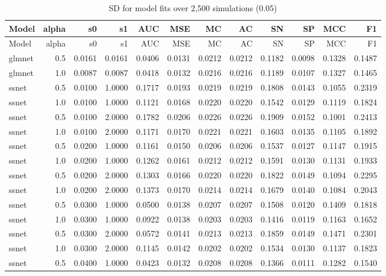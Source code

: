 \documentclass[
]{article}
\begin{document}
\begin{longtable}[]{@{}lrrrrrrrrrrr@{}}
\caption{SD for model fits over 2,500 simulations (0.05)}\tabularnewline
\toprule
Model & alpha & s0 & s1 & AUC & MSE & MC & AC & SN & SP & MCC & F1 \\
\midrule
\endfirsthead
\toprule
Model & alpha & s0 & s1 & AUC & MSE & MC & AC & SN & SP & MCC & F1 \\
\midrule
\endhead
glmnet & 0.5 & 0.0161 & 0.0161 & 0.0406 & 0.0131 & 0.0212 & 0.0212 &
0.1182 & 0.0098 & 0.1328 & 0.1487 \\
glmnet & 1.0 & 0.0087 & 0.0087 & 0.0418 & 0.0132 & 0.0216 & 0.0216 &
0.1189 & 0.0107 & 0.1327 & 0.1465 \\
ssnet & 0.5 & 0.0100 & 1.0000 & 0.1717 & 0.0193 & 0.0219 & 0.0219 &
0.1808 & 0.0143 & 0.1055 & 0.2319 \\
ssnet & 1.0 & 0.0100 & 1.0000 & 0.1121 & 0.0168 & 0.0220 & 0.0220 &
0.1542 & 0.0129 & 0.1119 & 0.1824 \\
ssnet & 0.5 & 0.0100 & 2.0000 & 0.1782 & 0.0206 & 0.0226 & 0.0226 &
0.1909 & 0.0152 & 0.1001 & 0.2413 \\
ssnet & 1.0 & 0.0100 & 2.0000 & 0.1171 & 0.0170 & 0.0221 & 0.0221 &
0.1603 & 0.0135 & 0.1105 & 0.1892 \\
ssnet & 0.5 & 0.0200 & 1.0000 & 0.1161 & 0.0150 & 0.0206 & 0.0206 &
0.1537 & 0.0127 & 0.1147 & 0.1915 \\
ssnet & 1.0 & 0.0200 & 1.0000 & 0.1262 & 0.0161 & 0.0212 & 0.0212 &
0.1591 & 0.0130 & 0.1131 & 0.1933 \\
ssnet & 0.5 & 0.0200 & 2.0000 & 0.1303 & 0.0166 & 0.0220 & 0.0220 &
0.1822 & 0.0149 & 0.1094 & 0.2295 \\
ssnet & 1.0 & 0.0200 & 2.0000 & 0.1373 & 0.0170 & 0.0214 & 0.0214 &
0.1679 & 0.0140 & 0.1084 & 0.2043 \\
ssnet & 0.5 & 0.0300 & 1.0000 & 0.0500 & 0.0138 & 0.0207 & 0.0207 &
0.1508 & 0.0120 & 0.1409 & 0.1818 \\
ssnet & 1.0 & 0.0300 & 1.0000 & 0.0922 & 0.0138 & 0.0203 & 0.0203 &
0.1416 & 0.0119 & 0.1163 & 0.1652 \\
ssnet & 0.5 & 0.0300 & 2.0000 & 0.0572 & 0.0141 & 0.0213 & 0.0213 &
0.1859 & 0.0149 & 0.1471 & 0.2301 \\
ssnet & 1.0 & 0.0300 & 2.0000 & 0.1145 & 0.0142 & 0.0202 & 0.0202 &
0.1534 & 0.0130 & 0.1137 & 0.1823 \\
ssnet & 0.5 & 0.0400 & 1.0000 & 0.0423 & 0.0132 & 0.0208 & 0.0208 &
0.1366 & 0.0111 & 0.1282 & 0.1540 \\

\end{longtable}
\end{document}
